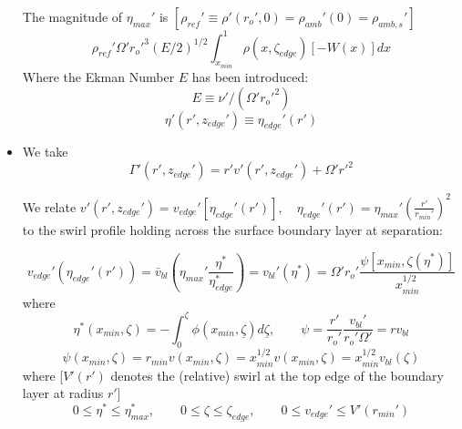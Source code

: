 \documentclass[preprint, prX]{revtex4}
\newcommand{\pfrac}[2]{\left(\frac{#1}{#2}\right)}
\newcommand{\rmin}{r_{min}}
\newcommand{\xmin}{x_{min}}
\newcommand{\zedge}{z_{edge}}
\begin{document}
\begin{itemize}
The magnitude of $\eta_{max}'$ is $[\rho_{ref}'\equiv \rho'(r_o',0)=\rho_{amb}'(0) = \rho_{amb,s}']$
\begin{equation}
\rho_{ref}'\Omega'r_o'^3 (E/2)^{1/2} \int_{\xmin}^1 \rho(x,\zeta_{edge})[-W(x)]dx
\end{equation}
Where the Ekman Number $E$ has been introduced:
\begin{equation}
E \equiv \nu'/(\Omega'r_o'^2)
\end{equation}
\begin{equation}
\eta'(r',\zedge') \equiv \eta_{edge}'(r')
\end{equation}

\item
We take
\begin{equation}
\Gamma'(r',\zedge') = r'v'(r',\zedge') + \Omega'r'^2
\end{equation}

We relate $v'(r',\zedge') = v_{edge}'[\eta_{edge}'(r')], \quad \eta_{edge}'(r') = \eta_{max}'\pfrac{r'}{\rmin'}^2$ to the swirl profile holding across the surface boundary layer at separation:

\begin{equation}
v_{edge}'(\eta_{edge}'(r')) = \bar{v}_{bl}\left( \eta_{max}'\frac{\eta^*}{\eta_{edge}^*}\right) = v_{bl}'(\eta^*) = \Omega' r_o' \frac{\psi[\xmin, \zeta(\eta^*)]}{\xmin^{1/2}}
\end{equation}
where
\begin{equation}
\eta^*(\xmin,\zeta) = -\int_0^\zeta \phi(\xmin,\underline{\zeta})d \underline{\zeta}, \qquad \psi = \frac{r'}{r_o'}\frac{v_{bl}'}{r_o' \Omega'}= r v_{bl}
\end{equation}
\begin{equation}
\psi(\xmin, \zeta) = \rmin v(\xmin,\zeta) = \xmin^{1/2} v(\xmin,\zeta) = \xmin^{1/2} v_{bl} (\zeta)
\end{equation}
where [$V'(r')$ denotes the (relative) swirl at the top edge of the boundary layer at radius $r'$]
\begin{equation}
0 \leq \eta^* \leq \eta_{max}^*, \qquad 0 \leq \zeta \leq \zeta_{edge}, \qquad 0 \leq v_{edge}' \leq V'(\rmin')
\end{equation}


\end{itemize}
\end{document}
